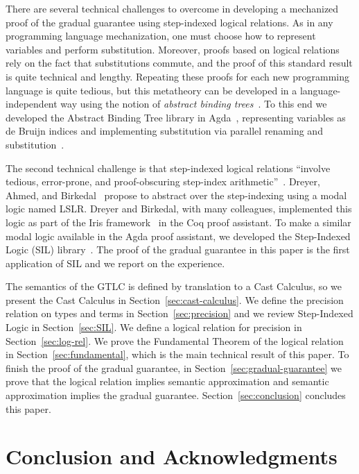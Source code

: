 \documentclass[submission,copyright,creativecommons]{eptcs}
\begin{document}
There are several technical challenges to overcome in developing a
mechanized proof of the gradual guarantee using step-indexed logical
relations. As in any programming language mechanization, one must
choose how to represent variables and perform substitution. Moreover,
proofs based on logical relations rely on the fact that substitutions
commute, and the proof of this standard result is quite technical and
lengthy. Repeating these proofs for each new programming language is
quite tedious, but this metatheory can be developed in a
language-independent way using the notion of \emph{abstract binding
  trees}~\cite{Harper:2012aa}. To this end we developed the Abstract
Binding Tree library in Agda~\cite{Siek:2021to}, representing
variables as de Bruijn indices and implementing substitution via
parallel renaming and
substitution~\cite{McBride:2005aa,Wadler:2020aa}.

The second technical challenge is that step-indexed logical relations
``involve tedious, error-prone, and proof-obscuring step-index
arithmetic''~\cite{Dreyer:2011wl}. Dreyer, Ahmed, and
Birkedal~\cite{Dreyer:2011wl} propose to abstract over the
step-indexing using a modal logic named LSLR. Dreyer and Birkedal,
with many colleagues, implemented this logic as part of the Iris
framework~\cite{JUNG:2018aa} in the Coq proof assistant. To make a
similar modal logic available in the Agda proof assistant, we
developed the Step-Indexed Logic (SIL) library~\cite{Siek:2023aa}.
The proof of the gradual guarantee in this paper is the first
application of SIL and we report on the experience.

The semantics of the GTLC is defined by translation to a Cast
Calculus, so we present the Cast Calculus in
Section~\ref{sec:cast-calculus}. We define the precision relation on
types and terms in Section~\ref{sec:precision} and we review
Step-Indexed Logic in Section~\ref{sec:SIL}.  We define a logical
relation for precision in Section~\ref{sec:log-rel}. We prove the
Fundamental Theorem of the logical relation in
Section~\ref{sec:fundamental}, which is the main technical result of
this paper. To finish the proof of the gradual guarantee, in
Section~\ref{sec:gradual-guarantee} we prove that the logical relation
implies semantic approximation and semantic approximation implies the
gradual guarantee. Section~\ref{sec:conclusion} concludes this paper.






\section{Conclusion and Acknowledgments}
\end{document}
